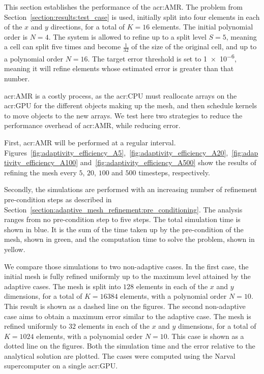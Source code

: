 This section establishes the performance of the \acrlong{acr:AMR}. The problem from
Section~\ref{section:results:test_case} is used, initially split into four elements in each of the
\(x\) and \(y\) directions, for a total of \(K = 16\) elements. The initial polynomial order is \(N
= 4\). The system is allowed to refine up to a split level \(S = 5\), meaning a cell can split five
times and become \(\frac{1}{32}\) of the size of the original cell, and up to a polynomial order \(N
= 16\). The target error threshold is set to \num{1e-6}, meaning it will refine elements whose
estimated error is greater than that number.

\Acrlong{acr:AMR} is a costly process, as the \acrshort{acr:CPU} must reallocate arrays on the
\acrshort{acr:GPU} for the different objects making up the mesh, and then schedule kernels to move
objects to the new arrays. We test here two strategies to reduce the performance overhead of
\acrlong{acr:AMR}, while reducing error. 

First, \acrlong{acr:AMR} will be performed at a regular interval.
Figures~\ref{fig:adaptivity_efficiency_A5},~\ref{fig:adaptivity_efficiency_A20},~\ref{fig:adaptivity_efficiency_A100}
and~\ref{fig:adaptivity_efficiency_A500} show the results of refining the mesh every \(5\), \(20\),
\(100\) and \(500\) timesteps, respectively.

Secondly, the simulations are performed with an increasing number of refinement pre-condition steps
as described in Section~\ref{section:adaptive_mesh_refinement:pre_conditioning}. The analysis ranges
from no pre-condition step to five steps. The total simulation time is shown in blue. It is the sum
of the time taken up by the pre-condition of the mesh, shown in green, and the computation time to
solve the problem, shown in yellow. 

We compare those simulations to two non-adaptive cases. In the first case, the initial mesh is fully
refined uniformly up to the maximum level attained by the adaptive cases. The mesh is split into
\(128\) elements in each of the \(x\) and \(y\) dimensions, for a total of \(K = 16384\) elements,
with a polynomial order \(N = 10\). This result is shown as a dashed line on the figures. The second
non-adaptive case aims to obtain a maximum error similar to the adaptive case. The mesh is refined
uniformly to \(32\) elements in each of the \(x\) and \(y\) dimensions, for a total of \(K = 1024\)
elements, with a polynomial order \(N = 10\). This case is shown as a dotted line on the figures.
Both the simulation time and the error relative to the analytical solution are plotted. The cases
were computed using the Narval supercomputer on a single \acrshort{acr:GPU}.

